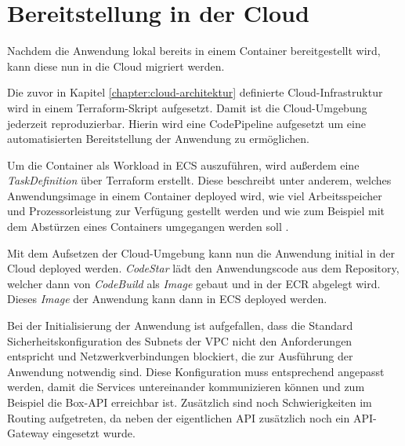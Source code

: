 \section{Bereitstellung in der Cloud}

Nachdem die Anwendung lokal bereits in einem Container bereitgestellt wird, kann diese nun in die Cloud migriert werden.

Die zuvor in Kapitel \ref{chapter:cloud-architektur} definierte Cloud-Infrastruktur wird in einem \gls{Terraform}-Skript aufgesetzt. Damit ist die Cloud-Umgebung jederzeit reproduzierbar. Hierin wird eine CodePipeline aufgesetzt um eine automatisierten Bereitstellung der Anwendung zu ermöglichen.

Um die Container als Workload in ECS auszuführen, wird außerdem eine \textit{TaskDefinition} über \gls{Terraform} erstellt. Diese beschreibt unter anderem, welches Anwendungsimage in einem Container deployed wird, wie viel Arbeitsspeicher und Prozessorleistung zur Verfügung gestellt werden und wie zum Beispiel mit dem Abstürzen eines Containers umgegangen werden soll \cite[Vgl.][]{AWSECS}.

Mit dem Aufsetzen der Cloud-Umgebung kann nun die Anwendung initial in der Cloud deployed werden. \textit{CodeStar} lädt den Anwendungscode aus dem \gls{Repository}, welcher dann von \textit{CodeBuild} als \textit{Image} gebaut und in der \ac{ECR} abgelegt wird. Dieses \textit{Image} der Anwendung kann dann in \ac{ECS} deployed werden.

Bei der Initialisierung der Anwendung ist aufgefallen, dass die Standard Sicherheitskonfiguration des Subnets der \ac{VPC} nicht den Anforderungen entspricht und Netzwerkverbindungen blockiert, die zur Ausführung der Anwendung notwendig sind. Diese Konfiguration muss entsprechend angepasst werden, damit die Services untereinander kommunizieren können und zum Beispiel die \gls{Box}-\ac{API} erreichbar ist. Zusätzlich sind noch Schwierigkeiten im Routing aufgetreten, da neben der eigentlichen \ac{API} zusätzlich noch ein \ac{API}-Gateway eingesetzt wurde.

